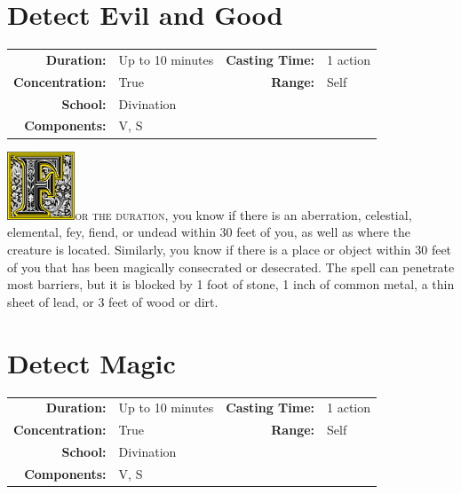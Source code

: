 \documentclass[12pt,showtrims]{memoir}
\begin{document}
\section*{Detect Evil and Good}

{
\small\centering\vspace{-6pt}
\begin{tabular}{rlrl}
\toprule

\textbf{Duration:} & Up to 10 minutes &
\textbf{Casting Time:} & 1 action \\
\textbf{Concentration:} & True &
\textbf{Range:} & Self \\
\textbf{School:} & Divination \\
\textbf{Components:} & \multicolumn{3}{p{0.7\textwidth}}{V, S}\\

\bottomrule
\end{tabular}
}

\vspace{1\baselineskip}\noindent
\lettrine[lines=4]{\includegraphics[height=58pt]{initials/F.png}}{or the duration}, you know if there is an aberration, celestial, elemental, fey, fiend, or undead within 30 feet of you, as well as where the creature is located. Similarly, you know if there is a place or object within 30 feet of you that has been magically consecrated or desecrated. The spell can penetrate most barriers, but it is blocked by 1 foot of stone, 1 inch of common metal, a thin sheet of lead, or 3 feet of wood or dirt.

\newpage




\section*{Detect Magic}
{
\small\centering\vspace{-6pt}
\begin{tabular}{rlrl}
\toprule

\textbf{Duration:} & Up to 10 minutes &
\textbf{Casting Time:} & 1 action \\
\textbf{Concentration:} & True &
\textbf{Range:} & Self \\
\textbf{School:} & Divination \\
\textbf{Components:} & \multicolumn{3}{p{0.7\textwidth}}{V, S}\\

\bottomrule
\end{tabular}
}
\end{document}

